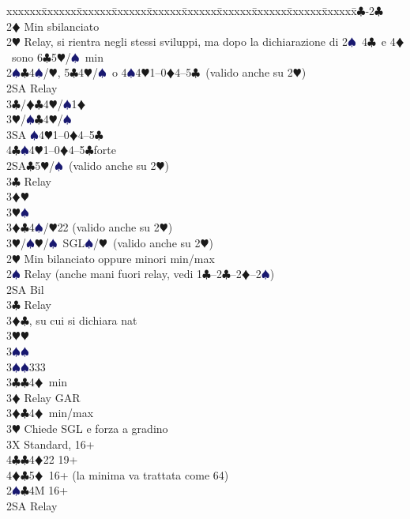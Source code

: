 \documentclass[a4paper,italian]{article}
\newcommand{\BC}{\textcolor{OliveGreen}{$\clubsuit$}}
\newcommand{\BD}{\textcolor{RedOrange}{$\vardiamondsuit$}}
\newcommand{\BH}{\textcolor{Red2}{$\varheartsuit${}}}
\newcommand{\BS}{\textcolor{MidnightBlue}{$\spadesuit${}}}
\newenvironment{bidtable}
{\begin{tabbing}

    xxxxxx\=xxxxxx\=xxxxxx\=xxxxxx\=xxxxxx\=xxxxxx\=xxxxxx\=xxxxxx\=xxxxxx\=xxxxxx\=\kill}
{\end{tabbing} }%
\begin{document}
\begin{bidtable}
    1\BC-2\BC\+\\
    2\BD \> Min sbilanciato\+\\
    2\BH \> Relay, si rientra negli stessi sviluppi, ma dopo la dichiarazione di 2\BS\ 4\BC\ e 4\BD\ sono 6\BC 5\BH /\BS\ min\\
    2\BS {}\BC4\BS/\BH, 5\BC4\BH/\BS\ o 4\BS4\BH1--0\BD4--5\BC\ (valido anche su 2\BH)\+\\
    2SA \> Relay\+\\
    3\BC/\BD {}\BC4\BH/\BS1\BD\\
    3\BH/\BS {}\BC4\BH/\BS\\
    3\small{SA} \BS4\BH1--0\BD4--5\BC\\
    4\BC {}\BS4\BH1--0\BD4--5\BC forte\-\-\\
    2\small{SA}\BC5\BH/\BS\ (valido anche su 2\BH)\+\\
    3\BC \> Relay\+\\
    3\BD {}\BH\\
    3\BH {}\BS\-\-\\
    3\BD {}\BC4\BS/\BH22  (valido anche su 2\BH)\\
    3\BH/\BS {}\BH/\BS\ SGL\BS/\BH\  (valido anche su 2\BH)\-\\
    2\BH \> Min bilanciato oppure minori min/max\+\\
    2\BS \> Relay (anche mani fuori relay, vedi 1\BC--2\BC--2\BD--2\BS)\+\\
    2\small{SA} \> Bil\+\\
    3\BC \> Relay\+\\
    3\BD {}\BC , su cui si dichiara nat\\
    3\BH {}\BH \+\\
    3\BS {}\BS \-\\
    3\BS {}\BS 333\-\-\\
    3\BC {}\BC 4\BD\ min\+\\
    3\BD \> Relay GAR\-\\
    3\BD {}\BC 4\BD\ min/max\+\\
    3\BH \> Chiede SGL e forza a gradino\-\\
    3X \> Standard, 16+\\
    4\BC {}\BC 4\BD 22 19+\\
    4\BD {}\BC 5\BD\ 16+ (la minima va trattata come 64)\-\-\\
    2\BS {}\BC 4M 16+\+\\
    2\small{SA} \> Relay\+\\

\end{bidtable}
\end{document}
